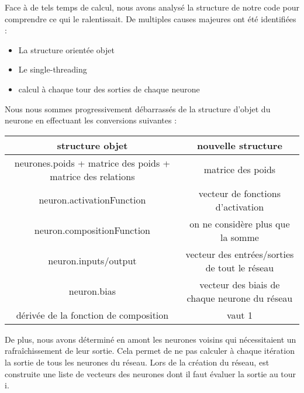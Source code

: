 Face à de tels temps de calcul, nous avons analysé la structure de notre code pour comprendre ce qui le ralentissait. De multiples causes majeures ont été identifiées : 
\begin{itemize}
\item La structure orientée objet
\item Le single-threading
\item calcul à chaque tour des sorties de chaque neurone
\end{itemize}

\bigskip

Nous nous sommes progressivement débarrassés de la structure d'objet du neurone en effectuant les conversions suivantes :

\bigskip

\begin{tabular}{c|c}
   structure objet & nouvelle structure \\
   \hline
   neurones.poids + matrice des poids + matrice des relations & matrice des poids \\
   neuron.activationFunction & vecteur de fonctions d'activation \\
   neuron.compositionFunction & on ne considère plus que la somme \\
   neuron.inputs/output & vecteur des entrées/sorties de tout le réseau \\
   neuron.bias & vecteur des biais de chaque neurone du réseau \\
   dérivée de la fonction de composition & vaut 1
\end{tabular}

\bigskip

De plus, nous avons déterminé en amont les neurones voisins qui nécessitaient un rafraîchissement de leur sortie. Cela permet de ne pas calculer à chaque itération la sortie de tous les neurones du réseau. Lors de la création du réseau, est construite une liste de vecteurs des neurones dont il faut évaluer la sortie au tour i.